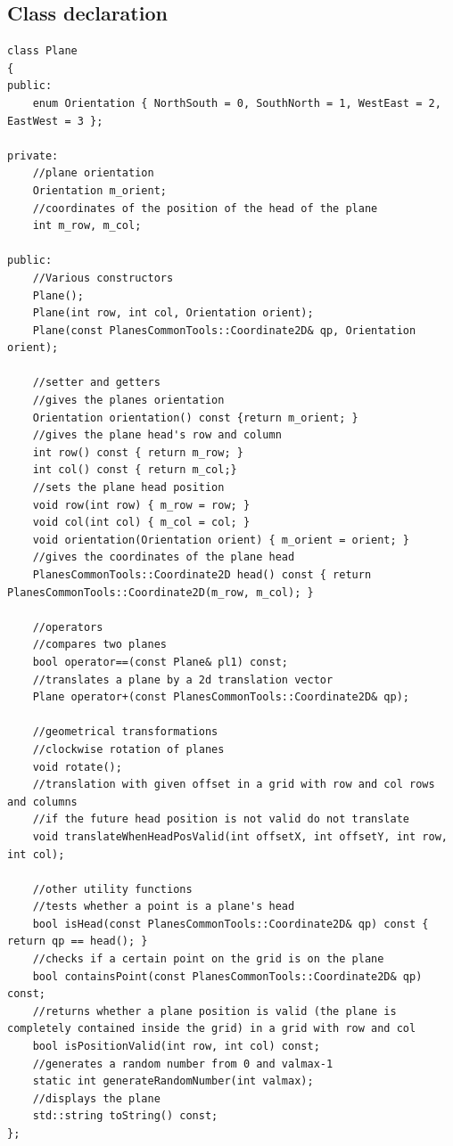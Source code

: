 \subsection{Class declaration}
\begin{lstlisting}[caption = {Plane Class Declaration}, captionpos = b, label=plane_declaration]
class Plane
{
public:
    enum Orientation { NorthSouth = 0, SouthNorth = 1, WestEast = 2, EastWest = 3 };

private:
    //plane orientation
    Orientation m_orient;
    //coordinates of the position of the head of the plane
    int m_row, m_col;

public:
    //Various constructors
    Plane();
    Plane(int row, int col, Orientation orient);
    Plane(const PlanesCommonTools::Coordinate2D& qp, Orientation orient);

    //setter and getters
    //gives the planes orientation
    Orientation orientation() const {return m_orient; }
    //gives the plane head's row and column
    int row() const { return m_row; }
    int col() const { return m_col;}
    //sets the plane head position
    void row(int row) { m_row = row; }
    void col(int col) { m_col = col; }
    void orientation(Orientation orient) { m_orient = orient; }
    //gives the coordinates of the plane head
    PlanesCommonTools::Coordinate2D head() const { return PlanesCommonTools::Coordinate2D(m_row, m_col); }

    //operators
    //compares two planes
    bool operator==(const Plane& pl1) const;
    //translates a plane by a 2d translation vector
    Plane operator+(const PlanesCommonTools::Coordinate2D& qp);

    //geometrical transformations
    //clockwise rotation of planes
    void rotate();
    //translation with given offset in a grid with row and col rows and columns
    //if the future head position is not valid do not translate
    void translateWhenHeadPosValid(int offsetX, int offsetY, int row, int col);

    //other utility functions
    //tests whether a point is a plane's head
    bool isHead(const PlanesCommonTools::Coordinate2D& qp) const { return qp == head(); }
    //checks if a certain point on the grid is on the plane
    bool containsPoint(const PlanesCommonTools::Coordinate2D& qp) const;
    //returns whether a plane position is valid (the plane is completely contained inside the grid) in a grid with row and col
    bool isPositionValid(int row, int col) const;
    //generates a random number from 0 and valmax-1
    static int generateRandomNumber(int valmax);
    //displays the plane
    std::string toString() const;
};
\end{lstlisting} 


